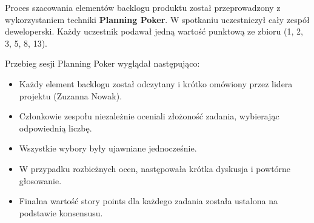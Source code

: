 \documentclass[12pt,a4paper,colorlinks=true,linkcolor=NavyBlue,citecolor=red,urlcolor=NavyBlue]{book}
\begin{document}
Proces szacowania elementów backlogu produktu został przeprowadzony z wykorzystaniem techniki \textbf{Planning Poker}.  
W spotkaniu uczestniczył cały zespół deweloperski.  
Każdy uczestnik podawał jedną wartość punktową ze zbioru (1, 2, 3, 5, 8, 13).

Przebieg sesji Planning Poker wyglądał następująco:
\begin{itemize}[topsep=0.1pt, itemsep=0.1pt]
    \item Każdy element backlogu został odczytany i krótko omówiony przez lidera projektu (Zuzanna Nowak).
    \item Członkowie zespołu niezależnie oceniali złożoność zadania, wybierając odpowiednią liczbę.
    \item Wszystkie wybory były ujawniane jednocześnie.
    \item W przypadku rozbieżnych ocen, następowała krótka dyskusja i powtórne głosowanie.
    \item Finalna wartość story points dla każdego zadania została ustalona na podstawie konsensusu.
\end{itemize}
\end{document}
